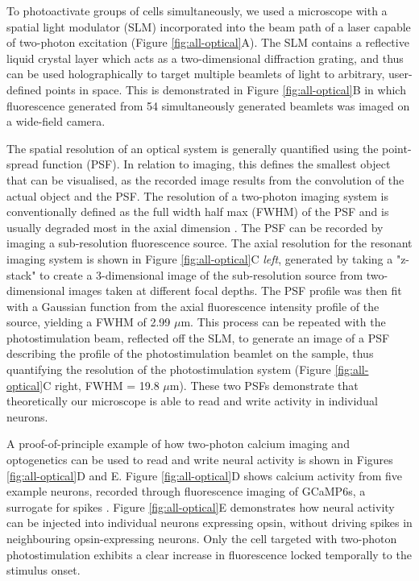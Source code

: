To photoactivate groups of cells simultaneously, we used a microscope with
a spatial light modulator (SLM) incorporated into the beam path of a laser capable of
two-photon excitation (Figure \ref{fig:all-optical}A). The SLM contains a reflective liquid crystal layer which acts as a two-dimensional diffraction grating, and thus can be used holographically to target multiple beamlets of light to arbitrary, user-defined points in space. This is demonstrated in Figure \ref{fig:all-optical}B in which fluorescence generated from 54 simultaneously generated beamlets was imaged on a wide-field camera.

The spatial resolution of an optical system is generally quantified using the point-spread function (PSF). In relation to imaging, this defines the smallest object that can be visualised, as the recorded image results from the convolution of the actual object and the PSF. The resolution of a two-photon imaging system is conventionally defined as the full width half max (FWHM) of the PSF and is usually degraded most in the axial dimension \cite{shaw_point-spread_1991}. The PSF can be recorded by imaging a sub-resolution fluorescence  source. The axial resolution for the resonant imaging system is shown in Figure \ref{fig:all-optical}C \textit{left}, generated by taking a "z-stack" to create a 3-dimensional image of the sub-resolution source from two-dimensional images taken at different focal depths. The PSF profile was then fit with a Gaussian function from the axial fluorescence intensity profile of the source, yielding a FWHM of 2.99 $\mu$m. This process can be repeated with the photostimulation beam, reflected off the SLM, to generate an image of a PSF describing the profile of the photostimulation beamlet on the sample, thus quantifying the resolution of the photostimulation system (Figure \ref{fig:all-optical}C right, FWHM = 19.8 $\mu$m). These two PSFs demonstrate that theoretically our microscope is able to read and write activity in individual neurons.

A proof-of-principle example of how two-photon calcium imaging and optogenetics can be used to read and write neural activity is shown in Figures \ref{fig:all-optical}D and E. Figure \ref{fig:all-optical}D shows calcium activity from five example neurons, recorded through fluorescence imaging of GCaMP6s, a surrogate for spikes \cite{chen_ultrasensitive_2013, huang_relationship_2021, grienberger_imaging_2012, packer_simultaneous_2015, stosiek_vivo_2003}. Figure \ref{fig:all-optical}E demonstrates how neural activity can be injected into individual neurons expressing opsin, without driving spikes in neighbouring opsin-expressing neurons. Only the  cell targeted with two-photon photostimulation exhibits a clear increase in fluorescence locked  temporally to the stimulus onset.

